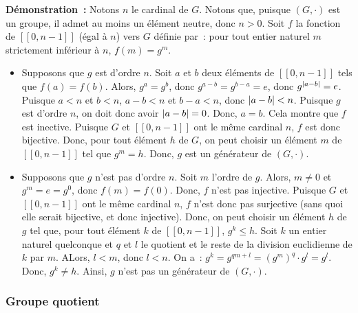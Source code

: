 \noindent\textbf{Démonstration :} 
Notons $n$ le cardinal de $G$.
Notons que, puisque $(G,\cdot)$ est un groupe, il admet au moins un élément neutre, donc $n > 0$.
Soit $f$ la fonction de $[\![0, n-1]\!]$ (égal à $n$) vers $G$ définie par : pour tout entier naturel $m$ strictement inférieur à $n$, $f(m) = g^m$.
\begin{itemize}[nosep]
    \item Supposons que $g$ est d'ordre $n$.
        Soit $a$ et $b$ deux éléments de $[\![0, n-1]\!]$ tels que $f(a) = f(b)$.
        Alors, $g^a = g^b$, donc $g^{a-b} = g^{b-a} = e$, donc $g^{\left\lvert a-b \right\rvert} = e$.
        Puisque $a < n$ et $b < n$, $a-b < n$ et $b-a < n$, donc $\left\lvert a-b \right\rvert < n$.
        Puisque $g$ est d'ordre $n$, on doit donc avoir $\left\lvert a-b \right\rvert = 0$.
        Donc, $a = b$.
        Cela montre que $f$ est inective.
        Puisque $G$ et $[\![0, n-1]\!]$ ont le même cardinal $n$, $f$ est donc bijective.
        Donc, pour tout élément $h$ de $G$, on peut choisir un élément $m$ de $[\![0, n-1]\!]$ tel que $g^m = h$.
        Donc, $g$ est un générateur de $(G,\cdot)$.
    \item Supposons que $g$ n'est pas d'ordre $n$. 
        Soit $m$ l'ordre de $g$.
        Alors, $m \neq 0$ et $g^m = e = g^0$, donc $f(m) = f(0)$.
        Donc, $f$ n'est pas injective.
        Puisque $G$ et $[\![0, n-1]\!]$ ont le même cardinal $n$, $f$ n'est donc pas surjective (sans quoi elle serait bijective, et donc injective).
        Donc, on peut choisir un élément $h$ de $g$ tel que, pour tout élément $k$ de $[\![0, n-1]\!]$, $g^k \leq h$.
        Soit $k$ un entier naturel quelconque et $q$ et $l$ le quotient et le reste de la division euclidienne de $k$ par $m$. 
        ALors, $l < m$, donc $l < n$.
        On a : $g^k = g^{q m + l} = (g^m)^q \cdot g^l = g^l$.
        Donc, $g^k \neq h$.
        Ainsi, $g$ n'est pas un générateur de $(G,\cdot)$.
\end{itemize}

\done

\subsubsection{Groupe quotient}

